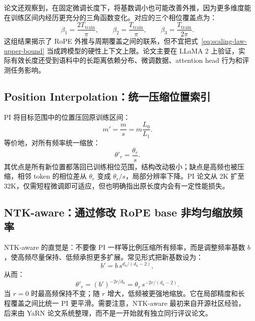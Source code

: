 \documentclass[UTF8,fontset=none,a4paper,10pt]{ctexart}
\begin{document}
论文还观察到，在固定微调长度下，将基数调小也可能改善外推，因为更多维度能在训练区间内经历更充分的三角函数变化。对应的三个相位覆盖点为：
\begin{equation}
  \beta_1=\frac{2T_{\mathrm{train}}}{\pi},\qquad
  \beta_2=\frac{T_{\mathrm{train}}}{\pi},\qquad
  \beta_3=\frac{T_{\mathrm{train}}}{2\pi}.
  \label{eq:scaling-law-small-base}
\end{equation}
这组结果揭示了 RoPE 外推与周期覆盖之间的联系，但不宜把式~\eqref{eq:scaling-law-upper-bound} 当成跨模型的硬性上下文上限。论文主要在 LLaMA 2 上验证，实际有效长度还受到语料中的长距离依赖分布、微调数据、attention head 行为和评测任务影响。

\subsection{Position Interpolation：统一压缩位置索引}

PI 将目标范围中的位置压回原训练区间\cite{chen2023pi}：
\begin{equation}
  m'=\frac{m}{s}=m\frac{L_0}{L_1}.
  \label{eq:pi-position}
\end{equation}
等价地，对所有频率统一缩放：
\begin{equation}
  \theta'_r=\frac{\theta_r}{s}.
  \label{eq:pi-frequency}
\end{equation}
其优点是所有新位置都落回已训练相位范围，结构改动极小；缺点是高频也被压缩，相邻 token 的相位差从 $\theta_r$ 变成 $\theta_r/s$，局部分辨率下降。PI 论文从 2K 扩至 32K，仅需短程微调即可适应，但也明确指出原长度内会有一定性能损失\cite{chen2023pi}。

\subsection{NTK-aware：通过修改 RoPE base 非均匀缩放频率}

NTK-aware 的直觉是：不要像 PI 一样等比例压缩所有频率，而是调整频率基数 $b$，使高频尽量保持、低频承担更多扩展。常见形式把新基数设为：
\begin{equation}
  b'=b\,s^{d_h/(d_h-2)},
  \label{eq:ntk-base}
\end{equation}
从而：
\begin{equation}
  \theta'_r=(b')^{-2r/d_h}
  =\theta_r\,s^{-2r/(d_h-2)}.
  \label{eq:ntk-frequency}
\end{equation}
当 $r=0$ 时最高频保持不变；随 $r$ 增大，低频被更强地缩放。它在局部精度和长程覆盖之间比统一 PI 更平滑。需要注意，NTK-aware 最初来自开源社区经验，后来由 YaRN 论文系统整理，而不是一开始就有独立同行评议论文\cite{peng2024yarn}。
\end{document}
